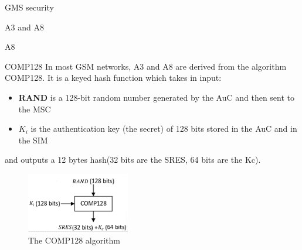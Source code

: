 \begin{section}{GMS security}
\begin{subsection}{A3 and A8}
\begin{subsubsection}{A8}
      \end{subsubsection}
      \begin{subsubsection}{COMP128}
        In most GSM networks, A3 and A8 are derived from the algorithm COMP128. It is a keyed hash
        function which takes in input:
        \begin{itemize}
          \item \textbf{RAND} is a 128-bit random number generated by the AuC and then sent to the MSC
          \item \textbf{$K_i$} is the authentication key (the secret) of 128 bits stored in the AuC and
            in the SIM
        \end{itemize}
        and outputs a 12 bytes hash(32 bits are the SRES, 64 bits are the Kc). 

        \begin{figure}[h]
          \centering
          \includegraphics[width=0.4\textwidth]{img/wireless/comp128.png}
          \caption{The COMP128 algorithm}
        \end{figure}


\end{subsubsection}
\end{subsection}
\end{section}
